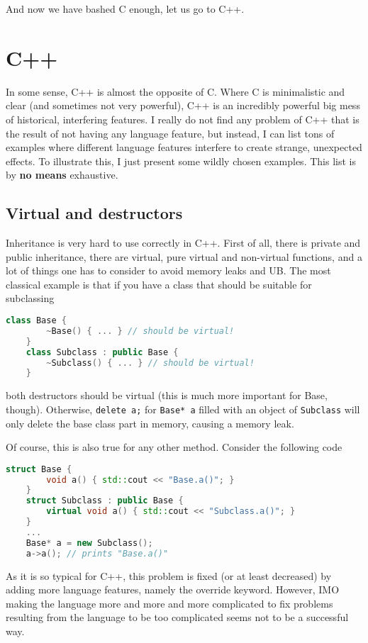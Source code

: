 \documentclass{scrartcl}
\begin{document}
And now we have bashed C enough, let us go to C++.

\section{C++}
In some sense, C++ is almost the opposite of C.
Where C is minimalistic and clear (and sometimes not very powerful), C++ is an incredibly powerful big mess of historical, interfering features.
I really do not find any problem of C++ that is the result of not having any language feature, but instead, I can list tons of examples where different language features interfere to create strange, unexpected effects.
To illustrate this, I just present some wildly chosen examples.
This list is by \textbf{no means} exhaustive.
\subsection{Virtual and destructors}
Inheritance is very hard to use correctly in C++. 
First of all, there is private and public inheritance, there are virtual, pure virtual and non-virtual functions, and a lot of things one has to consider to avoid memory leaks and UB.
The most classical example is that if you have a class that should be suitable for subclassing
\begin{lstlisting}[language = c++]
    class Base {
        ~Base() { ... } // should be virtual!
    }
    class Subclass : public Base {
        ~Subclass() { ... } // should be virtual!
    }
\end{lstlisting}
both destructors should be virtual (this is much more important for Base, though).
Otherwise, \lstinline{delete a;} for \lstinline{Base* a} filled with an object of \lstinline{Subclass} will only delete the base class part in memory, causing a memory leak.

Of course, this is also true for any other method.
Consider the following code
\begin{lstlisting}[language = c++]
    struct Base {
        void a() { std::cout << "Base.a()"; }
    }
    struct Subclass : public Base {
        virtual void a() { std::cout << "Subclass.a()"; }
    }
    ...
    Base* a = new Subclass();
    a->a(); // prints "Base.a()"
\end{lstlisting}
As it is so typical for C++, this problem is fixed (or at least decreased) by adding more language features, namely the override keyword.
However, IMO making the language more and more and more complicated to fix problems resulting from the language to be too complicated seems not to be a successful way.
\end{document}
